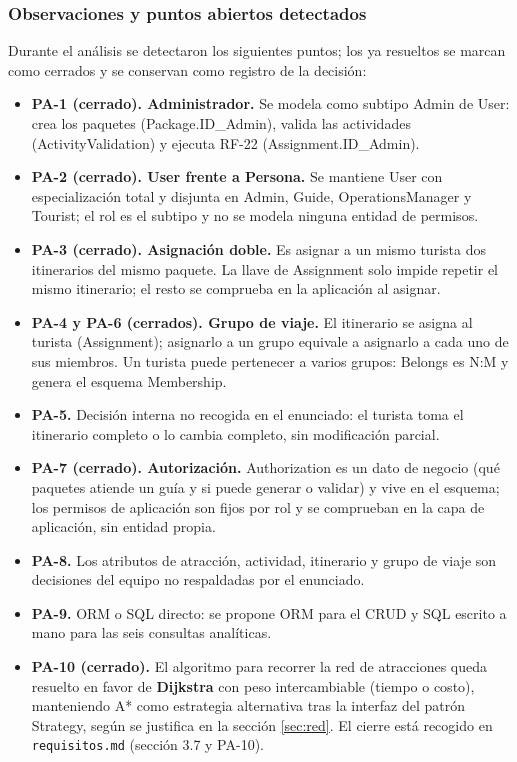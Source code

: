 \documentclass[11pt,a4paper]{article}
\begin{document}
\subsubsection{Observaciones y puntos abiertos detectados}\label{sec:abiertos}
Durante el análisis se detectaron los siguientes puntos; los ya resueltos se marcan como cerrados y se conservan como registro de la decisión:

\begin{itemize}[leftmargin=1.2em,itemsep=2pt,topsep=3pt]
\item \textbf{PA-1 (cerrado). Administrador.} Se modela como subtipo Admin de User: crea los paquetes (Package.ID\_Admin), valida las actividades (ActivityValidation) y ejecuta RF-22 (Assignment.ID\_Admin).
\item \textbf{PA-2 (cerrado). User frente a Persona.} Se mantiene User con especialización total y disjunta en Admin, Guide, OperationsManager y Tourist; el rol es el subtipo y no se modela ninguna entidad de permisos.
\item \textbf{PA-3 (cerrado). Asignación doble.} Es asignar a un mismo turista dos itinerarios del mismo paquete. La llave de Assignment solo impide repetir el mismo itinerario; el resto se comprueba en la aplicación al asignar.
\item \textbf{PA-4 y PA-6 (cerrados). Grupo de viaje.} El itinerario se asigna al turista (Assignment); asignarlo a un grupo equivale a asignarlo a cada uno de sus miembros. Un turista puede pertenecer a varios grupos: Belongs es N:M y genera el esquema Membership.
\item \textbf{PA-5.} Decisión interna no recogida en el enunciado: el turista toma el itinerario completo o lo cambia completo, sin modificación parcial.
\item \textbf{PA-7 (cerrado). Autorización.} Authorization es un dato de negocio (qué paquetes atiende un guía y si puede generar o validar) y vive en el esquema; los permisos de aplicación son fijos por rol y se comprueban en la capa de aplicación, sin entidad propia.
\item \textbf{PA-8.} Los atributos de atracción, actividad, itinerario y grupo de viaje son decisiones del equipo no respaldadas por el enunciado.
\item \textbf{PA-9.} ORM o SQL directo: se propone ORM para el CRUD y SQL escrito a mano para las seis consultas analíticas.
\item \textbf{PA-10 (cerrado).} El algoritmo para recorrer la red de atracciones queda resuelto en favor de \textbf{Dijkstra} con peso intercambiable (tiempo o costo), manteniendo A* como estrategia alternativa tras la interfaz del patrón Strategy, según se justifica en la sección \ref{sec:red}. El cierre está recogido en \texttt{requisitos.md} (sección 3.7 y PA-10).
\end{itemize}
\end{document}
